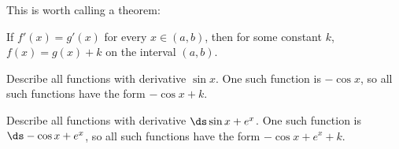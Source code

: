 This is worth calling a theorem:

\begin{theorem} If $f'(x)=g'(x)$ for every $x\in (a,b)$, then for some constant
$k$, $f(x)=g(x)+k$ on the interval $(a,b)$.
\end{theorem}

\begin{example}
Describe all functions with derivative $\sin x$. One such
function is $-\cos x$, so all such functions have the form
$-\cos x+k$.
\end{example}



\begin{example}
Describe all functions with derivative $\ds \sin x + e^x$. One such
function is $\ds -\cos x+e^x$, so all such functions have the form
$-\cos x+e^x+k$.
\end{example}

